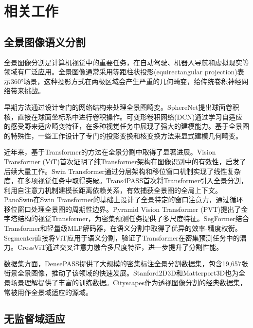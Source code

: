\section{相关工作}

\subsection{全景图像语义分割}

全景图像分割是计算机视觉中的重要任务，在自动驾驶、机器人导航和虚拟现实等领域有广泛应用\cite{ma2021densepass,yang2021omnirange}。全景图像通常采用等距柱状投影(equirectangular projection)表示360°场景，这种投影方式在两极区域会产生严重的几何畸变，给传统卷积神经网络带来挑战\cite{su2017learning}。

早期方法通过设计专门的网络结构来处理全景图畸变。SphereNet提出球面卷积核，直接在球面坐标系中进行卷积操作\cite{su2017learning}。可变形卷积网络(DCN)\cite{dai2017deformable}通过学习自适应的感受野来适应畸变特征，在多种视觉任务中展现了强大的建模能力。基于全景图的特殊性，一些工作设计了专门的投影变换和核变换方法来显式建模几何畸变。

近年来，基于Transformer的方法在全景分割中取得了显著进展。Vision Transformer (ViT)\cite{dosovitskiy2020image}首次证明了纯Transformer架构在图像识别中的有效性，启发了后续大量工作。Swin Transformer\cite{liu2021swin}通过分层架构和移位窗口机制实现了线性复杂度，在多项视觉任务中取得突破。Trans4PASS\cite{zhang2022trans4pass}首次将Transformer引入全景分割，利用自注意力机制建模长距离依赖关系，有效捕获全景图的全局上下文。PanoSwin\cite{yang2023panoswin}在Swin Transformer的基础上设计了全景特定的窗口注意力，通过循环移位窗口处理全景图的周期性边界。Pyramid Vision Transformer (PVT)\cite{wang2021pyramid}提出了金字塔结构的视觉Transformer，为密集预测任务提供了多尺度特征。SegFormer\cite{xie2021segformer}结合Transformer和轻量级MLP解码器，在语义分割中取得了优异的效率-精度权衡。Segmenter\cite{strudel2021segmenter}直接将ViT应用于语义分割，验证了Transformer在密集预测任务中的潜力。CrossViT\cite{chen2021crossvit}通过交叉注意力融合多尺度特征，进一步提升了分割性能。

数据集方面，DensePASS\cite{ma2021densepass}提供了大规模的密集标注全景分割数据集，包含19,657张街景全景图像，推动了该领域的快速发展。Stanford2D3D和Matterport3D也为全景场景理解提供了丰富的训练数据。Cityscapes\cite{cordts2016cityscapes}作为透视图像分割的经典数据集，常被用作全景域适应的源域。

\subsection{无监督域适应}

